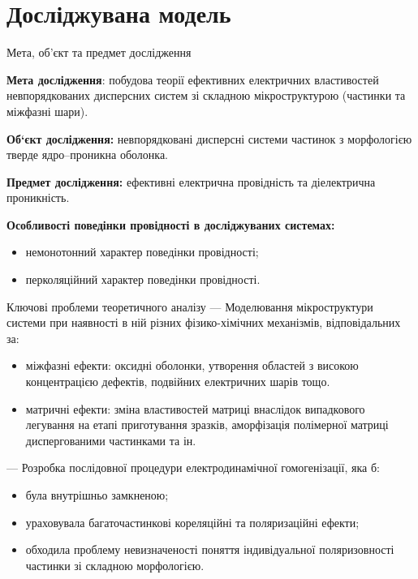 \documentclass[10pt]{beamer}
\begin{document}
\section{Досліджувана модель}
\begin{frame}{Мета, об'єкт та предмет дослідження }

{\bf Мета дослідження}:
побудова теорії ефективних електричних властивостей невпорядкованих дисперсних систем зі складною мікроструктурою (частинки та міжфазні шари).

\textbf{Об`єкт дослідження:} невпорядковані дисперсні системи частинок з морфологією тверде ядро--проникна оболонка.

\textbf{Предмет дослідження:} ефективні електрична провідність та діелектрична проникність. 

\textbf{Особливості поведінки провідності в досліджуваних системах:}
\begin{itemize}
\item немонотонний характер поведінки провідності;
\item перколяційний характер поведінки провідності.
\end{itemize}

\end{frame}

\begin{frame}{Ключові проблеми теоретичного аналізу}
--- Моделювання мікроструктури системи при наявності в ній різних фізико-хімічних механізмів, відповідальних за:
\begin{itemize}\footnotesize
    \item міжфазні ефекти: оксидні оболонки, утворення областей з високою концентрацією дефектів, подвійних електричних шарів тощо.
    \item матричні ефекти: зміна властивостей матриці внаслідок випадкового легування на етапі приготування зразків, аморфізація полімерної матриці диспергованими частинками та ін.
\end{itemize}

--- Розробка послідовної процедури електродинамічної гомогенізації, яка б:
  
\begin{itemize}\footnotesize
    \item була внутрішньо замкненою;
    \item ураховувала  багаточастинкові кореляційні та поляризаційні ефекти;
    \item обходила проблему невизначеності поняття індивідуальної поляризовності частинки зі складною морфологією.
\end{itemize}

\end{frame}
\end{document}
